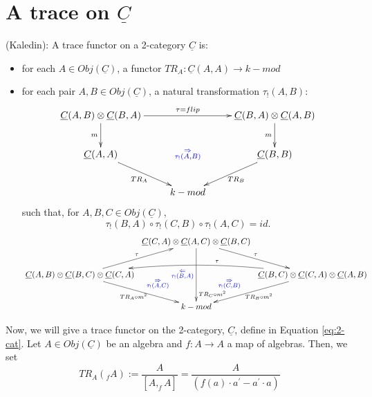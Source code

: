 \section{A trace on $\underline{C}$}
%
\begin{defn} \label{def:trace_functor}
(Kaledin): A trace functor on a 
2-category $\underline{C}$ is:
\begin{itemize}
	\item for each $A \in Obj(\underline{C})$, a functor 
	$TR_A: \underline{C}(A,A) \to k-mod$
	\item for each pair $A, B \in Obj(\underline{C})$, a natural transformation
	$\tau_!(A,B)$:
	$$\xymatrix{
	\underline{C}(A,B) \otimes \underline{C}(B,A)
	\ar[rr]^{\tau = flip}
	\ar[d]_{m}
	&& \underline{C}(B,A) \otimes \underline{C}(A,B)
	\ar[d]_{m} \\
	\underline{C}(A,A)
	\ar[rd]_{TR_A}
	& \textcolor{blue}{\substack{\Rightarrow\\ \tau_!(A,B)}}
	& \underline{C}(B,B) 
	\ar[ld]^{TR_B}\\
	& k-mod
	}$$
	such that, for $A,B,C \in Obj(\underline{C})$, 
	\begin{equation}
	\tau_!(B,A) \circ \tau_!(C,B) \circ \tau_!(A,C) = id.
	\end{equation}
	$$\xymatrixcolsep{0.25pc}
	\xymatrix{
	& \underline{C}(C,A) \otimes \underline{C}(A,C) \otimes \underline{C}(B,C) 
	\ar[rd]^{\tau}
	\ar[dd]_{\textcolor{blue}{
		\substack{\Leftarrow\\ \tau_!(B,A)}}}^{\substack{
		\\\\\\\\\\\\\\\\\\TR_C \circ m^2}}\\
	\underline{C}(A,B) \otimes \underline{C}(B,C) \otimes \underline{C}(C,A) 
	\ar[ru]^{\tau}
	\ar[rd]^{\textcolor{blue}{\quad \quad \quad \substack{\Rightarrow\\ \tau_!(A,C)}}}_{TR_A\circ m^2}
	&& \underline{C}(B,C) \otimes \underline{C}(C,A) \otimes \underline{C}(A,B)
	\ar@/_1pc/[ll]_{\quad \quad \quad \quad \quad \tau}
	\ar[ld]_{\textcolor{blue}{\substack{\Rightarrow\\ \tau_!(C,B)}}\quad \quad\quad \quad}^{TR_B \circ m^2}\\
	& k-mod
	}$$
\end{itemize}
\end{defn}
%
Now, we will give a trace functor on the 
2-category, $\underline{C}$, define in Equation 
\ref{eq:2-cat}. Let $A \in Obj(\underline{C})$ 
be an algebra and $f: A \to A$ a map of algebras. 
Then, we set
$$TR_A(_fA) := \frac{A}{[A, _fA]}
= \frac{A}{(f(a)\cdot a^\prime - a^\prime \cdot a)}$$

